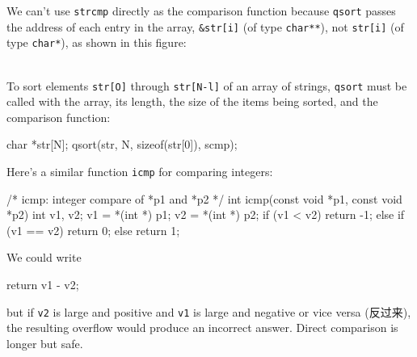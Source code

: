We can't use \verb'strcmp' directly as the comparison function because
\verb'qsort' passes the address of each entry in the array, \verb'&str[i]'
(of type \verb'char**'), not \verb'str[i]' (of type \verb'char*'), as shown
in this figure:
\begin{figure}[h]
    \centering
\end{figure}\\
To sort elements \verb'str[O]' through \verb'str[N-l]' of an array of
strings, \verb'qsort' must be called with the array, its length, the size
of the items being sorted, and the comparison function:
\begin{wellcode}
    char *str[N];
    qsort(str, N, sizeof(str[0]), scmp);
\end{wellcode}

Here's a similar function \verb'icmp' for comparing integers:
\begin{wellcode}
    /* icmp: integer compare of *p1 and *p2 */
    int icmp(const void *p1, const void *p2)
    {
        int v1, v2;
        v1 = *(int *) p1;
        v2 = *(int *) p2;
        if (v1 < v2)
            return -1;
        else if (v1 == v2)
            return 0;
        else
            return 1;
    }
\end{wellcode}
We could write
\begin{badcode}
    return v1 - v2;
\end{badcode}
but if \verb'v2' is large and positive and \verb'v1' is large and negative
or vice versa (反过来), the resulting overflow would produce an incorrect
answer. Direct comparison is longer but safe.

